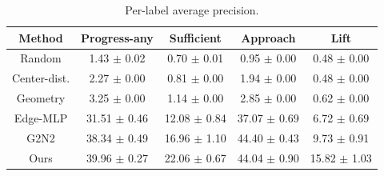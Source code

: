 \begin{table}[htbp]
  \centering
  \caption{Per-label average precision.}
  \label{tab:stage2_per_label_ap}
  \small
  \setlength{\tabcolsep}{4.5pt}
  \begin{tabular}{ccccc}
    \toprule
    Method & Progress-any & Sufficient & Approach & Lift \\
    \midrule
    Random & 1.43 $\pm$ 0.02 & 0.70 $\pm$ 0.01 & 0.95 $\pm$ 0.00 & 0.48 $\pm$ 0.00 \\
    Center-dist. & 2.27 $\pm$ 0.00 & 0.81 $\pm$ 0.00 & 1.94 $\pm$ 0.00 & 0.48 $\pm$ 0.00 \\
    Geometry & 3.25 $\pm$ 0.00 & 1.14 $\pm$ 0.00 & 2.85 $\pm$ 0.00 & 0.62 $\pm$ 0.00 \\
    Edge-MLP & 31.51 $\pm$ 0.46 & 12.08 $\pm$ 0.84 & 37.07 $\pm$ 0.69 & 6.72 $\pm$ 0.69 \\
    G2N2 & 38.34 $\pm$ 0.49 & 16.96 $\pm$ 1.10 & 44.40 $\pm$ 0.43 & 9.73 $\pm$ 0.91 \\
    Ours & 39.96 $\pm$ 0.27 & 22.06 $\pm$ 0.67 & 44.04 $\pm$ 0.90 & 15.82 $\pm$ 1.03 \\
    \bottomrule
  \end{tabular}
\end{table}
